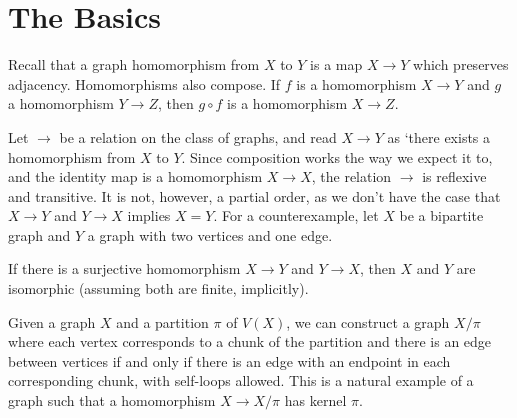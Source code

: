 
\section*{The Basics}

Recall that a graph homomorphism from $X$ to $Y$ is a map $X\rightarrow Y$ which preserves adjacency.  Homomorphisms also compose.  If $f$ is a homomorphism $X\rightarrow Y$ and $g$ a homomorphism $Y\rightarrow Z$, then $g\circ f$ is a homomorphism $X\rightarrow Z$.

Let $\rightarrow$ be a relation on the class of graphs, and read $X\rightarrow Y$ as `there exists a homomorphism from $X$ to $Y$.  Since composition works the way we expect it to, and the identity map is a homomorphism $X\rightarrow X$, the relation $\rightarrow$ is reflexive and transitive.  It is not, however, a partial order, as we don't have the case that $X\rightarrow Y$ and $Y\rightarrow X$ implies $X=Y$.  For a counterexample, let $X$ be a bipartite graph and $Y$ a graph with two vertices and one edge.

	
	If there is a surjective homomorphism $X\rightarrow Y$ and $Y\rightarrow X$, then $X$ and $Y$ are isomorphic (assuming both are finite, implicitly).
	

Given a graph $X$ and a partition $\pi$ of $V(X)$, we can construct a graph $X/\pi$ where each vertex corresponds to a chunk of the partition and there is an edge between vertices if and only if there is an edge with an endpoint in each corresponding chunk, with self-loops allowed.  This is a natural example of a graph such that a homomorphism $X\rightarrow X/\pi$ has kernel $\pi$.

